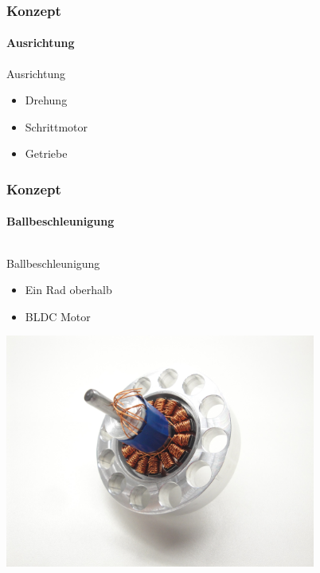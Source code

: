 \begin{frame}
    \frametitle{Konzept}
    \framesubtitle{Ausrichtung}
    \begin{block}{Ausrichtung}
        \begin{itemize}
            \item Drehung
            \item Schrittmotor
            \item Getriebe
        \end{itemize}
    \end{block}
\end{frame}

\begin{frame}
    \frametitle{Konzept}
    \framesubtitle{Ballbeschleunigung}
    \begin{columns}
        \begin{column}{0.4\textwidth}
            \begin{block}{Ballbeschleunigung}
                \begin{itemize}
                    \item Ein Rad oberhalb
                    \item<2-> BLDC Motor
                \end{itemize}
            \end{block}
            \centering
            \pause
            \includegraphics[width=0.8\textwidth, trim = 330mm 200mm 300mm 100mm, clip]{../fig/bldc/DSC02754.JPG}
        \end{column}
        \begin{column}{0.6\textwidth}
            \centering
            \onslide

\end{column}
\end{columns}
\end{frame}
